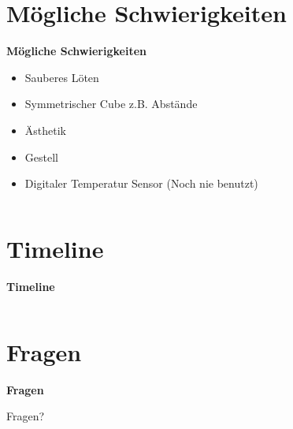 \documentclass[aspectratio=169]{beamer}
\begin{document}
\section{Mögliche Schwierigkeiten} 
\begin{frame}[fragile]
\textbf{Mögliche Schwierigkeiten}
\begin{itemize}
\item Sauberes Löten
\item Symmetrischer Cube z.B. Abstände
\item Ästhetik
\item Gestell 
\item Digitaler Temperatur Sensor (Noch nie benutzt)
\end{itemize}
\begin{columns}
\begin{column}{0.45\textwidth}


\end{column}
\begin{column}{0.5\textwidth}

\end{column}

\end{columns}
\end{frame}


\section{Timeline} 
\begin{frame}[fragile]
\textbf{Timeline}
\begin{columns}
\begin{column}{0.45\textwidth}

\end{column}
\begin{column}{0.5\textwidth}


\end{column}

\end{columns}
\end{frame}

\section{Fragen} 
\begin{frame}[fragile]
\textbf{Fragen}

\begin{center}
Fragen?
\end{center}

\end{frame}
\end{document}
